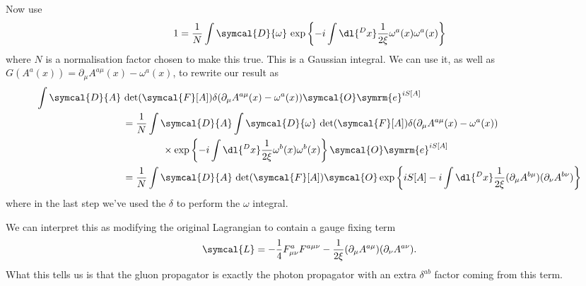 \documentclass[fleqn]{NotesClass}
\newcommand{\e}{\symrm{e}}
\newcommand{\lagrangianDensity}{\symcal{L}}
\newcommand{\DL}[1]{\symcal{D}{#1}}
\begin{document}
    Now use
    \begin{equation}
        1 = \frac{1}{N} \int \DL{\omega} \, \exp\left\{ -i \int \dl{^Dx} \frac{1}{2\xi} \omega^a(x)\omega^a(x) \right\}
    \end{equation}
    where \(N\) is a normalisation factor chosen to make this true.
    This is a Gaussian integral.
    We can use it, as well as \(G(A^a(x)) = \partial_\mu A^{a\mu}(x) - \omega^a(x)\), to rewrite our result as
    \begin{align}
        \int \DL{A} \, &\det(\symcal{F}[A]) \delta(\partial_\mu A^{a\mu}(x) - \omega^a(x)) \symcal{O} \e^{iS[A]}\\
        &= \frac{1}{N} \int \DL{A} \int \DL{\omega} \, \det(\symcal{F}[A]) \delta(\partial_\mu A^{a\mu}(x) - \omega^a(x)) \notag\\
        &\qquad\qquad \times \exp\left\{ -i\int \dl{^Dx} \frac{1}{2\xi} \omega^b(x)\omega^b(x) \right\} \symcal{O} \e^{iS[A]}\\
        &= \frac{1}{N} \int \DL{A} \, \det(\symcal{F}[A]) \symcal{O} \exp\left\{ iS[A] - i\int \dl{^Dx} \frac{1}{2\xi} (\partial_\mu A^{b\mu})(\partial_\nu A^{b\nu}) \right\} \notag
    \end{align}
    where in the last step we've used the \(\delta\) to perform the \(\omega\) integral.
    
    We can interpret this as modifying the original Lagrangian to contain a gauge fixing term
    \begin{equation}
        \lagrangianDensity = -\frac{1}{4}F^a_{\mu\nu}F^{a\mu\nu} - \frac{1}{2\xi}(\partial_\mu A^{a\mu})(\partial_\nu A^{a\nu}).
    \end{equation}
    What this tells us is that the gluon propagator is exactly the photon propagator with an extra \(\delta^{ab}\) factor coming from this term.
    
\end{document}
